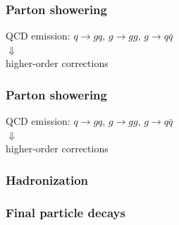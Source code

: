 \begin{frame}\frametitle{Parton showering}
\centering\myskip

\vspace{.4\paperheight}


QCD emission: $q\to gq$, $g\to gg$, $g\to q\bar{q}$\\
{\LARGE $\Downarrow$}\\
higher-order corrections 

\end{frame}

\begin{frame}\frametitle{Parton showering}
\centering\myskip

\vspace{.4\paperheight}


QCD emission: $q\to gq$, $g\to gg$, $g\to q\bar{q}$\\
{\LARGE $\Downarrow$}\\
higher-order corrections 


\end{frame}

\begin{frame}\frametitle{Hadronization}
\centering\myskip


\vspace{.4\paperheight}


\end{frame}

\begin{frame}\frametitle{Final particle decays}
\centering\myskip


\vspace{.4\paperheight}


\end{frame}

